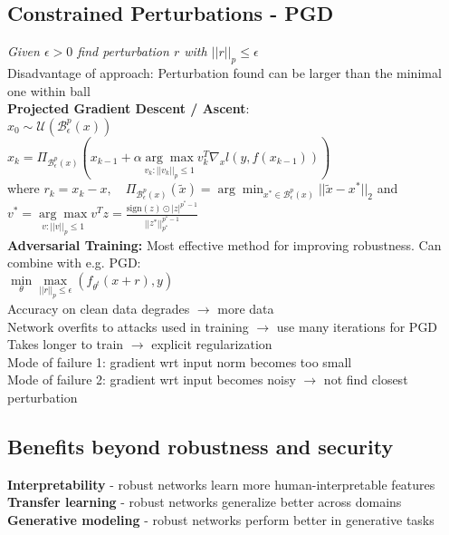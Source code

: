 \subsection*{Constrained Perturbations - PGD}
\textit{Given $\epsilon>0$ find perturbation $r$ with $||r||_p\leq\epsilon$}\\
Disadvantage of approach: Perturbation found can be larger than the minimal one within ball\\
\textbf{Projected Gradient Descent / Ascent}:\\
$x_0\sim\mathcal U(\mathcal B_\epsilon^p(x))$\\
$x_k=\Pi_{\mathcal B_\epsilon^p(x)}(x_{k-1}+\alpha\underset{v_k: ||v_k||_p\leq 1}{\arg\max}v_k^T\nabla_xl(y,f(x_{k-1})))$\\
where $r_k=x_k-x, \quad\Pi_{\mathcal B_\epsilon^p(x)}(\tilde x)=\arg\min_{x^*\in \mathcal B_\epsilon^p(x)}||\tilde x-x^*||_2$ and $v^*=\underset{v: ||v||_p\leq 1}{\arg\max}v^Tz=\frac{\text{sign}(z)\odot|z|^{p^*-1}}{||z^*||^{p^*-1}_{p^*}}$\\
\textbf{Adversarial Training:} Most effective method for improving robustness. Can combine with e.g. PGD:\\
$\underset{\theta}{\min}\underset{||r||_p\leq \epsilon}{\max}(f_{\theta^t}(x+r),y)$\\
Accuracy on clean data degrades $\rightarrow$ more data \\
Network overfits to attacks used in training $\rightarrow$ use many iterations for PGD\\
Takes longer to train $\rightarrow$ explicit regularization\\
Mode of failure 1: gradient wrt input norm becomes too small \\
Mode of failure 2: gradient wrt input becomes noisy $\rightarrow$ not find closest perturbation
\subsection*{Benefits beyond robustness and security}
\textbf{Interpretability} - robust networks learn more human-interpretable features \\
\textbf{Transfer learning} - robust networks generalize better across domains \\
\textbf{Generative modeling} - robust networks perform better in generative tasks 
